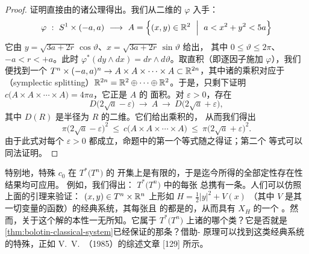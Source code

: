 \begin{proof}
证明直接由\trCapacity{}的诸公理得出。我们从二维的\trSymplecticDiffeomorphism{}%
$\varphi$ 入手：
\[
\varphi\ :\ S^{1}\times(-a,a)\ \longrightarrow\ A=\Bigl\{(x,y)\in\R^{2}\ %
\Bigm|\ a<x^{2}+y^{2}<5a\Bigr\}
\]
它由 $y=\sqrt{3a+2r}\,\cos\vartheta$、$x=\sqrt{3a+2r}\,\sin\vartheta$ 给出，%
其中 $0\leq\vartheta\leq2\pi$、$-a<r<+a$。此时 $\varphi^{*}(dy\wedge dx)=%
dr\wedge d\vartheta$。取直积（即逐因子施加 $\varphi$），我们便找到一个%
\trSymplecticDiffeomorphism{} $T^{n}\times(-a,a)^{n}\to A\times A\times\cdots\times A%
\subset\R^{2n}$，其中诸\trAnnulus{}的乘积对应于\textbf{\trSymplecticSplitting}（symplectic
splitting）$\mathbb{R}^{2n}=\mathbb{R}^{2}\oplus\cdots\oplus\mathbb{R}^{2}$。于是，只剩下证明%
$c\bigl(A\times A\times\cdots\times A\bigr)=4\pi a$，它正是\trAnnulus{} $A$ 的%
面积。对 $\varepsilon>0$，存在\trSymplecticEmbedding
\[
D\bigl(2\sqrt{a}-\varepsilon\bigr)\ \longrightarrow\ A\ \longrightarrow\ %
D\bigl(2\sqrt{a}+\varepsilon\bigr),
\]
其中 $D(R)$ 是半径为 $R$ 的二维\trDisc。它们给出乘积的\trSymplecticEmbedding，%
从而我们得出
\[
\pi\bigl(2\sqrt{a}-\varepsilon\bigr)^{2}\ \leq\ %
c\bigl(A\times A\times\cdots\times A\bigr)\ \leq\ %
\pi\bigl(2\sqrt{a}+\varepsilon\bigr)^{2}.
\]
由于此式对每个 $\varepsilon>0$ 都成立，命题中的第一个等式随之得证；第二个%
等式可以同法证明。
\end{proof}

特别地，特殊\trCapacity{} $c_{0}$ 在 $T^{*}\bigl(T^{n}\bigr)$ 的%
\trBounded{}开集上是有限的，于是迄今所得的全部定性存在性结果均可应用。%
例如，我们得出：%
$T^{*}\bigl(T^{n}\bigr)$ 中\trContactType{}的每张\trCompact\trHypersurface{}%
总携有一条\trClosedCharacteristic。人们可以仿照上面的引理来验证：%
$(x,y)\in T^{n}\times\mathbb{R}^{n}$ 上形如 $H=\tfrac{1}{2}\lvert y\rvert^{2}+V(x)$%
（其中 $V$ 是其一切变量的\trPeriodic{}函数）的经典系统，其每张\trCompact{}且%
\trRegular{}的\trEnergySurface{}都是\trContactType{}的，从而具有 $X_{H}$ 的一个%
\trPeriodicSolution。然而，关于这个解的本性一无所知。它属于%
$T^{*}\bigl(T^{n}\bigr)$ 上诸\trLoop{}的哪个\trHomotopy{}类？它是否就是%
\cref{thm:bolotin-classical-system}已经保证的那条\trBrakeOrbit？借助\trMaupertuis-%
\trJacobi{}原理可以找到这类经典系统的特殊\trPeriodicSolution，正如%
V.~V.~\trKoslov（1985）的综述文章 [129] 所示。
